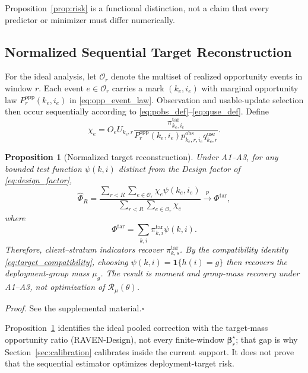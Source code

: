 \documentclass[letterpaper,journal]{IEEEtran}
\newtheorem{proposition}{Proposition}
\begin{document}
Proposition~\ref{prop:risk} is a functional distinction, not a claim that
every predictor or minimizer must differ numerically.

\subsection{Normalized Sequential Target Reconstruction}
\label{subsec:prop_reconstruction}

For the ideal analysis, let $\mathcal{O}_r$ denote the multiset of realized
opportunity events in window $r$.  Each event $e\in\mathcal{O}_r$ carries a
mark $(k_e,i_e)$ with marginal opportunity law
$P_r^{\mathrm{opp}}(k_e,i_e)$ in \eqref{eq:opp_event_law}.  Observation and
usable-update selection then occur sequentially according to
\eqref{eq:pobs_def}--\eqref{eq:quse_def}.  Define
\begin{equation}
 \chi_e
 =
 O_e U_{k_e,r}
 \frac{
 \pi^{\mathrm{tar}}_{k_e,i_e}
 }{
 P_r^{\mathrm{opp}}(k_e,i_e)
 p^{\mathrm{obs}}_{k_e,r,i_e}
 q^{\mathrm{use}}_{k_e,r}
 }.
 \label{eq:chi_event}
\end{equation}

\begin{proposition}[Normalized target reconstruction]
\label{prop:reconstruction}
Under A1--A3, for any bounded test function $\psi(k,i)$ distinct from the
Design factor of \eqref{eq:design_factor},
\begin{equation}
 \widehat\Phi_R
 =
 \frac{
 \sum_{r<R}
 \sum_{e\in\mathcal{O}_r}
 \chi_e\psi(k_e,i_e)
 }{
 \sum_{r<R}
 \sum_{e\in\mathcal{O}_r}
 \chi_e
 }
 \xrightarrow{p}
 \Phi^{\mathrm{tar}},
 \label{eq:hajek_phi}
\end{equation}
where
\begin{equation}
 \Phi^{\mathrm{tar}}
 =
 \sum_{k,i}
 \pi^{\mathrm{tar}}_{k,i}\psi(k,i).
 \label{eq:target_phi}
\end{equation}
Therefore, client--stratum indicators recover
$\pi^{\mathrm{tar}}_{k,s}$.  By the compatibility identity
\eqref{eq:target_compatibility}, choosing
$\psi(k,i)=\mathbf{1}\{h(i)=g\}$ then recovers the deployment-group mass
$\mu_g$.  The result is moment and group-mass recovery under A1--A3, not
optimization of $\mathcal{R}_{\mu}(\theta)$.
\end{proposition}

\noindent\emph{Proof.}
See the supplemental material.\hfill$\square$

Proposition~\ref{prop:reconstruction} identifies the ideal pooled correction
with the target-mass opportunity ratio (RAVEN-Design),
not every finite-window $\boldsymbol\beta_r^\star$; that gap is why
Section~\ref{sec:calibration} calibrates inside the current support.
It does not prove that the sequential estimator optimizes deployment-target
risk.
\end{document}
